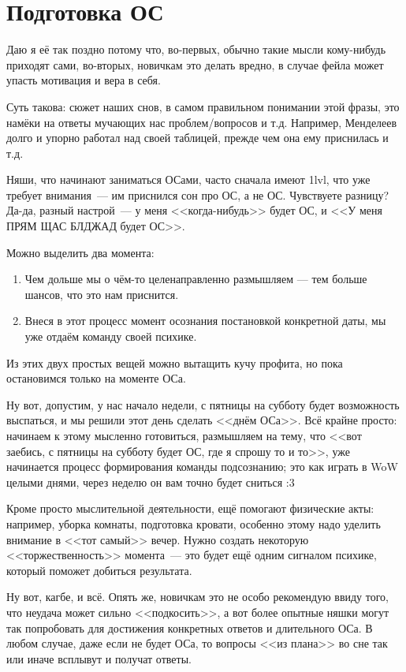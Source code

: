 \documentclass[a4paper,14pt,oneside]{memoir}
\begin{document}
\chapter{Подготовка ОС}
Даю я её так поздно потому что, во-первых, обычно такие мысли кому-нибудь приходят сами, во-вторых, новичкам это делать вредно, в случае фейла может упасть мотивация и вера в себя. 

Суть такова: сюжет наших снов, в самом правильном понимании этой фразы, это намёки на ответы мучающих нас проблем/вопросов и т.д. Например, Менделеев долго и упорно работал над своей таблицей, прежде чем она ему приснилась и т.д.

Няши, что начинают заниматься ОСами, часто сначала имеют 1lvl, что уже требует внимания~--- им приснился сон про ОС, а не ОС. Чувствуете разницу? Да-да, разный настрой~--- у меня <<когда-нибудь>> будет ОС, и <<У меня ПРЯМ ЩАС БЛДЖАД будет ОС>>. 

Можно выделить два момента:
\begin{enumerate}
\item Чем дольше мы о чём-то целенаправленно размышляем — тем больше шансов, что это нам приснится. 
\item Внеся в этот процесс момент осознания постановкой конкретной даты, мы уже отдаём команду своей психике. 
\end{enumerate}

Из этих двух простых вещей можно вытащить кучу профита, но пока остановимся только на моменте ОСа. 

Ну вот, допустим, у нас начало недели, с пятницы на субботу будет возможность выспаться, и мы решили этот день сделать <<днём ОСа>>. Всё крайне просто: начинаем к этому мысленно готовиться, размышляем на тему, что <<вот заебись, с пятницы на субботу будет ОС, где я спрошу то и то>>, уже начинается процесс формирования команды подсознанию; это как играть в WoW целыми днями, через неделю он вам точно будет сниться :3 

Кроме просто мыслительной деятельности, ещё помогают физические акты: например, уборка комнаты, подготовка кровати, особенно этому надо уделить внимание в <<тот самый>> вечер. Нужно создать некоторую <<торжественность>> момента~--- это будет ещё одним сигналом психике, который поможет добиться результата. 

Ну вот, кагбе, и всё. Опять же, новичкам это не особо рекомендую ввиду того, что неудача может сильно <<подкосить>>, а вот более опытные няшки могут так попробовать для достижения конкретных ответов и длительного ОСа. В любом случае, даже если не будет ОСа, то вопросы <<из плана>> во сне так или иначе всплывут и получат ответы. 
\end{document}
